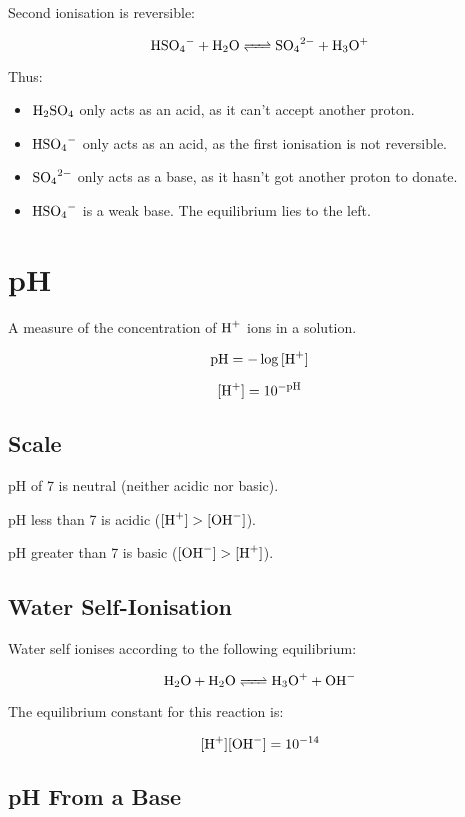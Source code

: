 \documentclass[a4paper,11pt]{article}
\begin{document}
Second ionisation is reversible:

$$
\ce{HSO4- + H2O <=> SO4^2- + H3O+}
$$

Thus:

\begin{itemize}
\item $\ce{H2SO4}$ only acts as an acid, as it can't accept another proton.
\item $\ce{HSO4-}$ only acts as an acid, as the first ionisation is not
	reversible.
\item $\ce{SO4^2-}$ only acts as a base, as it hasn't got another proton to
	donate.
\item $\ce{HSO4-}$ is a weak base. The equilibrium lies to the left.
\end{itemize}


\section{pH}

A measure of the concentration of $\ce{H+}$ ions in a solution.

$$
\text{pH} = -\log{[\ce{H+}]}
$$

$$
[\ce{H+}] = 10^{-\text{pH}}
$$


\subsection{Scale}

pH of 7 is neutral (neither acidic nor basic).

pH less than 7 is acidic ($[\ce{H+}] > [\ce{OH-}]$).

pH greater than 7 is basic ($[\ce{OH-}] > [\ce{H+}]$).


\subsection{Water Self-Ionisation}

Water self ionises according to the following equilibrium:

$$
\ce{H2O + H2O <=> H3O+ + OH-}
$$

The equilibrium constant for this reaction is:

$$
[\ce{H+}][\ce{OH-}] = 10^{-14}
$$


\subsection{pH From a Base}
\end{document}

